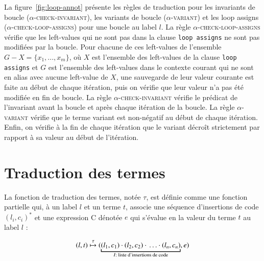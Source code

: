 La figure~\ref{fig:loop-annot} présente les règles de traduction pour les
invariants de boucle (\textsc{$\alpha$-check-invariant}), les variants de boucle
(\textsc{$\alpha$-variant}) et les loop assigns
(\textsc{$\alpha$-check-loop-assigns}) pour une boucle au label $l$.
La règle \textsc{$\alpha$-check-loop-assigns} vérifie que les left-values qui ne
sont pas dans la clause \lstinline'loop assigns' ne sont pas modifiées par la
boucle.
Pour chacune de ces left-values de l'ensemble $G-X = \{x_1, ..., x_m\}$, où $X$
est l'ensemble des left-values de la clause \lstinline'loop assigns' et $G$ est
l'ensemble des left-values dans le contexte courant qui ne sont en alias avec
aucune left-value de $X$, une sauvegarde de leur valeur courante est faite au
début de chaque itération, puis on vérifie que leur valeur n'a pas été modifiée
en fin de boucle.
La règle \textsc{$\alpha$-check-invariant} vérifie le prédicat de l'invariant
avant la boucle et après chaque itération de la boucle.
La règle \textsc{$\alpha$-variant} vérifie que le terme variant est non-négatif
au début de chaque itération.
Enfin, on vérifie à la fin de chaque itération que le variant décroît
strictement par rapport à sa valeur au début de l'itération.


\section{Traduction des termes \eacsl}
\label{sec:term}


La fonction de traduction des termes, notée $\tau$, est définie comme une
fonction partielle qui, à un label $l$ et un terme $t$, associe une séquence
d'insertions de code $(l_i, c_i)^*$ et une expression C dénotée $e$ qui s'évalue
en la valeur du terme $t$ au label $l$ :

\[
(l, t) \trule
(\underbracket{(l_1, c_1) \concat (l_2, c_2) \concat \ldots
  \concat (l_n, c_n)}_{I : \text{ liste d'insertions de code}}, e)
\]

